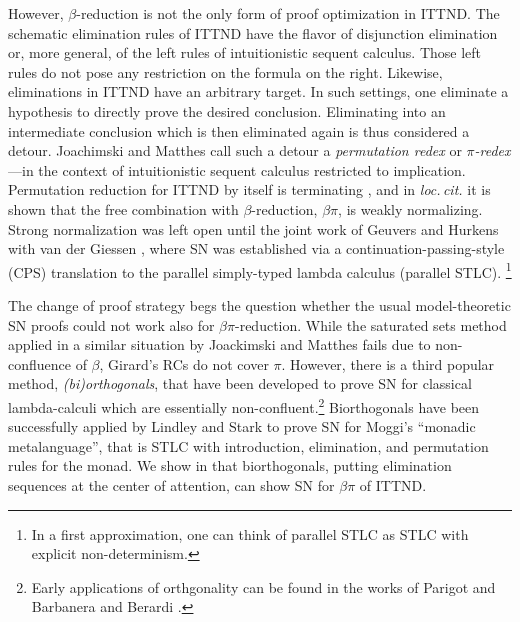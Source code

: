 \documentclass[a4paper,USenglish,cleveref, autoref, thm-restate]{lipics-v2019}
\newcommand{\loccit}{\emph{loc.\,cit.}\xspace}
\begin{document}
However, $\beta$-reduction is not the only form of proof optimization in ITTND.
The schematic elimination rules of ITTND have the flavor of
disjunction elimination or, more general, of the left rules of
intuitionistic sequent calculus.  Those left rules do not pose any
restriction on the formula on the right.  Likewise, eliminations in
ITTND have an arbitrary target.  In such settings, one eliminate a hypothesis to directly prove the desired conclusion.
Eliminating into an intermediate conclusion which is then eliminated
again is thus considered a detour.
Joachimski and Matthes \cite{joachimskiMatthes:rta00}
call such a detour a \emph{permutation redex} or
\emph{$\pi$-redex}\footnotemark{}
---in the context of intuitionistic sequent calculus restricted to implication.
%
Permutation reduction for ITTND by itself is terminating
\cite{geuversHurkens:types17}, and in \loccit it is shown that the
free combination with $\beta$-reduction, $\beta\pi$, is weakly
normalizing.  Strong normalization was left open until the joint work
of Geuvers and Hurkens
with van der Giessen \cite{geuversGiessenHurkens:fundinf19}, where SN
was established via a continuation-passing-style (CPS) translation to
the parallel simply-typed lambda calculus (parallel STLC).%
\footnote{In a first approximation, one can think of parallel STLC as STLC with explicit non-determinism.}

The change of proof strategy begs the question whether the usual
model-theoretic SN proofs could not work also for
$\beta\pi$-reduction.  While the saturated sets method applied in
a similar situation by Joackimski and Matthes
\cite{joachimskiMatthes:rta00} fails due to non-confluence of $\beta$,
Girard's RCs do not cover $\pi$.  However, there is a third popular
method, \emph{(bi)orthogonals}, that have been developed to prove SN for classical lambda-calculi which are essentially non-confluent.\footnote{Early applications of orthgonality can be found in the works of Parigot \cite{parigot:jsl97,parigot:lamsym} and Barbanera and Berardi \cite{barbanera:lamsym}.}
Biorthogonals have been successfully applied by
Lindley and Stark \cite{lindleyStark:tlca05} to prove SN for Moggi's
``monadic metalanguage'', that is STLC with introduction, elimination,
and permutation rules for the monad.  We show in  that
biorthogonals, putting elimination sequences at the center of
attention, can show SN for $\beta\pi$ of ITTND.
\end{document}

